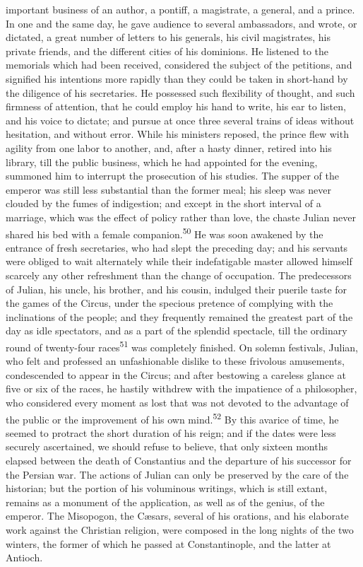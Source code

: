 important business of an author, a pontiff, a magistrate, a
general, and a prince. In one and the same day, he gave audience
to several ambassadors, and wrote, or dictated, a great number of
letters to his generals, his civil magistrates, his private
friends, and the different cities of his dominions. He listened
to the memorials which had been received, considered the subject
of the petitions, and signified his intentions more rapidly than
they could be taken in short-hand by the diligence of his
secretaries. He possessed such flexibility of thought, and such
firmness of attention, that he could employ his hand to write,
his ear to listen, and his voice to dictate; and pursue at once
three several trains of ideas without hesitation, and without
error. While his ministers reposed, the prince flew with agility
from one labor to another, and, after a hasty dinner, retired
into his library, till the public business, which he had
appointed for the evening, summoned him to interrupt the
prosecution of his studies. The supper of the emperor was still
less substantial than the former meal; his sleep was never
clouded by the fumes of indigestion; and except in the short
interval of a marriage, which was the effect of policy rather
than love, the chaste Julian never shared his bed with a female
companion.\textsuperscript{50} He was soon awakened by the entrance of fresh
secretaries, who had slept the preceding day; and his servants
were obliged to wait alternately while their indefatigable master
allowed himself scarcely any other refreshment than the change of
occupation. The predecessors of Julian, his uncle, his brother,
and his cousin, indulged their puerile taste for the games of the
Circus, under the specious pretence of complying with the
inclinations of the people; and they frequently remained the
greatest part of the day as idle spectators, and as a part of the
splendid spectacle, till the ordinary round of twenty-four races\textsuperscript{51}
was completely finished. On solemn festivals, Julian, who felt
and professed an unfashionable dislike to these frivolous
amusements, condescended to appear in the Circus; and after
bestowing a careless glance at five or six of the races, he
hastily withdrew with the impatience of a philosopher, who
considered every moment as lost that was not devoted to the
advantage of the public or the improvement of his own mind.\textsuperscript{52} By
this avarice of time, he seemed to protract the short duration of
his reign; and if the dates were less securely ascertained, we
should refuse to believe, that only sixteen months elapsed
between the death of Constantius and the departure of his
successor for the Persian war. The actions of Julian can only be
preserved by the care of the historian; but the portion of his
voluminous writings, which is still extant, remains as a monument
of the application, as well as of the genius, of the emperor. The
Misopogon, the Cæsars, several of his orations, and his elaborate
work against the Christian religion, were composed in the long
nights of the two winters, the former of which he passed at
Constantinople, and the latter at Antioch.

